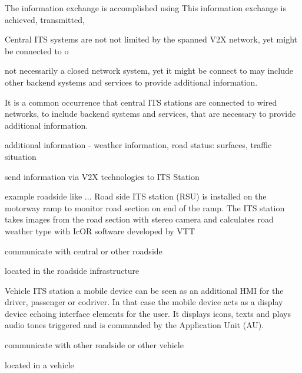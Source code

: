 The information exchange is accomplished using 
This information exchange is achieved, transmitted,

Central ITS systems are not 
not limited by the spanned V2X network, yet might be connected to o

not necessarily a closed network system, yet it might be connect to
may include other backend systems and services to provide additional information.

It is a common occurrence that central ITS stations are connected to wired networks, to include backend systems and services, that are necessary to provide additional information.



additional information 
- weather information, road status: surfaces, traffic situation

send information via V2X technologies to ITS Station





example roadside like ...
Road side ITS station (RSU) is installed on the motorway ramp to monitor road section on end of the ramp. The ITS station takes images from the road section with stereo camera and calculates road weather type with IcOR software developed by VTT

communicate with central or other roadside

located in the roadside infrastructure


Vehicle ITS station a mobile device can be seen as an additional HMI for the driver, passenger or codriver. In that case the mobile device acts as a display device echoing interface elements for the user. It displays icons, texts and plays audio tones triggered and is commanded by the Application Unit (AU).

communicate with other roadside or other vehicle

located in a vehicle




